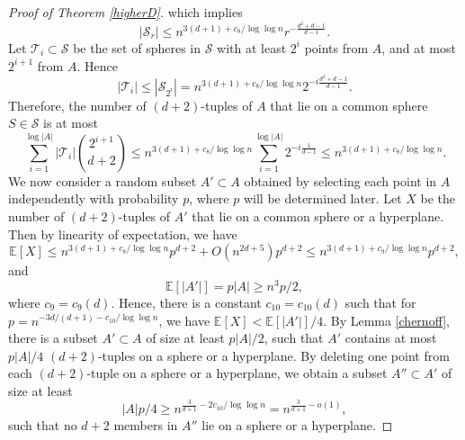 \begin{proof}[Proof of Theorem \ref{higherD}]
%
    \noindent which implies 
%
$$|\mathcal{S}_r| \leq n^{3(d+1)+c_8/\log\log n} r^{-\frac{d^2+d-1}{d-1}}.$$
%
Let $\mathcal{T}_i\subset \mathcal{S}$ be the set of spheres in $\mathcal{S}$ with at least $2^i$ points from $A$, and at most $2^{i +1}$ from $A$.  Hence
%
$$|\mathcal{T}_i| \leq |\mathcal{S}_{2^i}| = n^{3(d+1)+c_8/\log\log n} 2^{-i\frac{d^2+d-1}{d-1}}.$$
%
\noindent Therefore, the number of $(d+2)$-tuples of $A$ that lie on a common sphere $S \in \mathcal{S}$ is at most
%
%
$$\sum\limits_{i = 1}^{\log |A|} |\mathcal{T}_i|\binom{2^{i + 1}}{d+2} \leq n^{3(d+1)+c_8/\log\log n}\sum\limits_{i = 1}^{\log |A|}  2^{-i\frac{1}{d-1}} \leq n^{3(d+1)+c_8/\log\log n}. $$
%
%
%
We now consider a random subset $A'\subset A$ obtained by selecting each point in $A$ independently with probability $p$, where $p$ will be determined later. Let $X$ be the number of $(d+2)$-tuples of $A'$ that lie on a common sphere or a hyperplane.  Then by linearity of expectation, we have
%
%
$$\mathbb{E}[X] \leq n^{3(d+1)+c_8/\log\log n}p^{d+2} + O(n^{2d + 5})p^{d+2} \leq n^{3(d+1)+c_9/\log\log n}p^{d+2},$$
%
\noindent and
%
$$\mathbb{E}[|A'|] = p|A|\geq n^3p/2,$$where $c_9 = c_9(d)$.  Hence, there is a constant $c_{10} = c_{10}(d)$ such that for $p = n^{-3d/(d+1) - c_{10}/\log\log n}$, we have $\mathbb{E}[X] < \mathbb{E}[|A'|]/4$.  By Lemma \ref{chernoff}, there is a subset $A'\subset A$ of size at least $p|A|/2$, such that $A'$ contains at most $p|A|/4$ $(d+2)$-tuples on a sphere or a hyperplane.  By deleting one point from each $(d+2)$-tuple on a sphere or a hyperplane, we obtain a subset $A''\subset A'$ of size at least
$$|A|p/4 \geq n^{\frac{3}{d+ 1} - 2c_{10}/\log\log n} = n^{\frac{3}{d+ 1} - o(1)},$$
%
\noindent such that no $d+2$ members in $A''$ lie on a sphere or a hyperplane.\end{proof}
%
%
%
%
%
%
%
%
%
%
%
%
%
%
%
